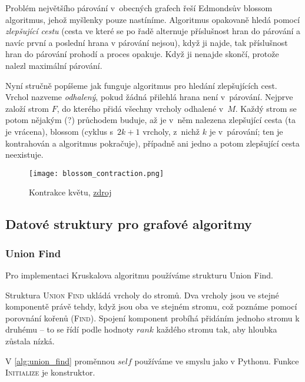 Problém největšího párování v~obecných grafech řeší Edmondsův blossom
algoritmus, jehož myšlenky pouze nastíníme.
Algoritmus opakovaně hledá pomocí {\em zlepšující
cestu} (cesta ve které
se po řadě alternuje příslušnost hran do párování a navíc první a
poslední hrana v párování nejsou), když ji najde, tak příslušnost hran do
párování prohodí a proces opakuje. Když ji nenajde skončí, protože
nalezl maximální párování.

Nyní stručně popíšeme jak funguje algoritmus pro hledání zlepšujících
cest. Vrchol nazveme {\em odhalený}, pokud žádná přilehlá hrana není v~párování.
Nejprve založí strom $F$, do kterého přidá všechny vrcholy odhalené
v~$M$. Každý strom se potom nějakým (?) průchodem buduje, až je v~něm nalezena zlepšující
cesta (ta je vrácena), blossom (cyklus s~$2k+1$ vrcholy, z~nichž $k$ je
v~párování; ten je kontrahován a algoritmus pokračuje), případně ani
jedno a potom zlepšující cesta neexistuje.

\begin{figure}[H]
    \centering
    \texttt{[image: blossom\_contraction.png]}
    \caption{Kontrakce květu, \href{https://en.wikipedia.org/wiki/Blossom_algorithm}{zdroj}}
\end{figure}



\subsection{Datové struktury pro grafové algoritmy}
\label{subsec:data_structures}

\subsubsection{Union Find}
Pro implementaci Kruskalova
algoritmu používáme strukturu Union Find.

Struktura \textsc{Union Find} ukládá vrcholy do stromů.
Dva vrcholy jsou ve stejné komponentě právě tehdy, když jsou oba
ve stejném stromu, což poznáme pomocí porovnání kořenů (\textsc{Find}).
Spojení komponent probíhá přidáním jednoho stromu k druhému -- to se
řídí podle hodnoty $rank$ každého stromu tak, aby hloubka zůstala nízká.

V \autoref{alg:union_find} proměnnou $self$ používáme ve smyslu jako v
Pythonu. Funkce \textsc{Initialize} je konstruktor.


